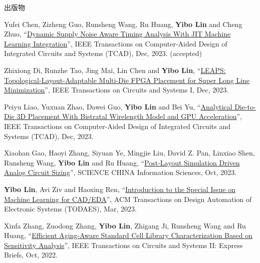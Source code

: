 \begin{rSection}{出版物}
\begin{description}[font=\normalfont, rightmargin=2em]
{}
            

\item[{[J44]}]{
        Yufei Chen, Zizheng Guo, Runsheng Wang, Ru Huang, \textbf{Yibo Lin} and Cheng Zhuo, 
    ``\href{https://doi.org/10.1109/TCAD.2023.3342603}{Dynamic Supply Noise Aware Timing Analysis With JIT Machine Learning Integration}'', 
    IEEE Transactions on Computer-Aided Design of Integrated Circuits and Systems (TCAD), Dec, 2023.
    (accepted)
}
            

\item[{[J43]}]{
        Zhixiong Di, Runzhe Tao, Jing Mai, Lin Chen and \textbf{Yibo Lin}, 
    ``\href{https://doi.org/10.1109/TCSI.2023.3340554}{LEAPS: Topological-Layout-Adaptable Multi-Die FPGA Placement for Super Long Line Minimization}'', 
    IEEE Transactions on Circuits and Systems I, Dec, 2023.
    
}
            

\item[{[J42]}]{
        Peiyu Liao, Yuxuan Zhao, Dawei Guo, \textbf{Yibo Lin} and Bei Yu, 
    ``\href{https://doi.org/10.1109/TCAD.2023.3347293}{Analytical Die-to-Die 3D Placement With Bistratal Wirelength Model and GPU Acceleration}'', 
    IEEE Transactions on Computer-Aided Design of Integrated Circuits and Systems (TCAD), Dec, 2023.
    
}
            

\item[{[J41]}]{
        Xiaohan Gao, Haoyi Zhang, Siyuan Ye, Mingjie Liu, David Z. Pan, Linxiao Shen, Runsheng Wang, \textbf{Yibo Lin} and Ru Huang, 
    ``\href{https://doi.org/10.1007/s11432-022-3878-5}{Post-Layout Simulation Driven Analog Circuit Sizing}'', 
    SCIENCE CHINA Information Sciences, Oct, 2023.
    
}
            

\item[{[J40]}]{
        \textbf{Yibo Lin}, Avi Ziv and Haoxing Ren, 
    ``\href{https://doi.org/10.1145/3586208}{Introduction to the Special Issue on Machine Learning for CAD/EDA}'', 
    ACM Transactions on Design Automation of Electronic Systems (TODAES), Mar, 2023.
    
}
            

\item[{[J39]}]{
        Xinfa Zhang, Zuodong Zhang, \textbf{Yibo Lin}, Zhigang Ji, Runsheng Wang and Ru Huang, 
    ``\href{https://doi.org/10.1109/TCSII.2022.3212123}{Efficient Aging-Aware Standard Cell Library Characterization Based on Sensitivity Analysis}'', 
    IEEE Transactions on Circuits and Systems II: Express Briefs, Oct, 2022.
    
}
\end{description}
\end{rSection}
